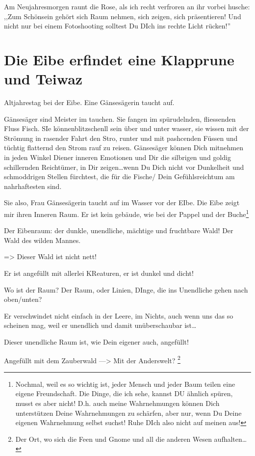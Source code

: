 \documentclass[11pt,titlepage,a5paper]{book}
\begin{document}
Am Neujahresmorgen raunt die Rose, als ich recht verfroren an ihr vorbei husche: ,,Zum Schönsein gehört sich Raum nehmen, sich zeigen, sich präsentieren! Und nicht nur bei einem Fotoshooting solltest Du DIch ins rechte Licht rücken!''


\section{Die Eibe erfindet eine Klapprune und Teiwaz  }


Altjahrestag bei der Eibe. Eine Gänsesägerin taucht auf. 

Gänsesäger sind Meister im tauchen. Sie fangen im spürudelnden, fliessenden Fluss Fisch. SIe könnenblitzschenll sein über und unter wasser, sie wissen mit der Strömung in rasender Fahrt den Stro, runter und mit pashcenden Füssen und tüchtig flatternd den Strom rauf zu reisen. Gänsesäger können Dich mitnehmen in jeden Winkel Diener inneren Emotionen und Dir die silbrigen und goldig schillernden Reichtümer, in Dir zeigen\dots wenn Du Dich nicht vor Dunkelheit und schmoddrigen Stellen fürchtest, die für die Fische/ Dein Gefühlsreichtum am nahrhaftesten sind.

Sie also, Frau Gänsesägerin taucht auf im Wasser vor der EIbe. Die Eibe zeigt mir ihren Inneren Raum. Er ist kein gebäude, wie bei der Pappel und der Buche\footnote{Nochmal, weil es so wichtig ist, jeder Mensch und jeder Baum teilen eine eigene Freundschaft. Die Dinge, die ich sehe, kannst DU ähnlich spüren, musst es aber nicht! D.h. auch meine Wahrnehmungen können Dich unterstützen Deine Wahrnehmungen zu schärfen, aber nur, wenn Du Deine eigenen Wahrnehmung selbst suchst! Ruhe DIch also nicht auf meinen aus!}

Der Eibenraum: der dunkle, unendliche, mächtige und fruchtbare Wald! Der Wald des wilden Mannes.

=> Dieser Wald ist nicht nett!

Er ist angefüllt mit allerlei KReaturen, er ist dunkel und dicht!

Wo ist der Raum? Der Raum, oder Linien, DInge, die ins Unendliche gehen nach oben/unten?

Er verschwindet nicht einfach in der Leere, im Nichts, auch wenn uns das so scheinen mag, weil er unendlich und damit unüberschaubar ist\dots

Dieser unendliche Raum ist, wie Dein eigener auch, angefüllt!

Angefüllt mit dem Zauberwald ---> Mit der Anderswelt? \footnote{Der Ort, wo sich die Feen und Gnome und all die anderen Wesen aufhalten\dots}
\end{document}

